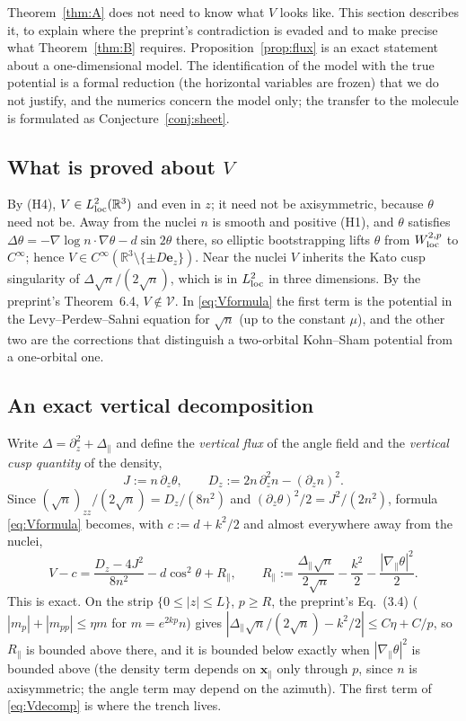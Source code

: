 \documentclass[11pt,a4paper]{article}
\theoremstyle{plain}
\theoremstyle{definition}
\theoremstyle{remark}
\newcommand{\R}{\mathbb{R}}
\newcommand{\VV}{\mathcal{V}}
\begin{document}
Theorem~\ref{thm:A} does not need to know what $V$ looks like. This section describes it, to explain where the preprint's contradiction is evaded and to make precise what Theorem~\ref{thm:B} requires. Proposition~\ref{prop:flux} is an exact statement about a one-dimensional model. The identification of the model with the true potential is a formal reduction (the horizontal variables are frozen) that we do not justify, and the numerics concern the model only; the transfer to the molecule is formulated as Conjecture~\ref{conj:sheet}.

\subsection{What is proved about $V$}
By (H4), $V\in L^2_{\rm loc}(\R^3)$ and even in $z$; it need not be axisymmetric, because $\theta$ need not be. Away from the nuclei $n$ is smooth and positive (H1), and $\theta$ satisfies $\Delta\theta=-\nabla\log n\cdot\nabla\theta-d\sin 2\theta$ there, so elliptic bootstrapping lifts $\theta$ from $W^{2,p}_{\rm loc}$ to $C^\infty$; hence $V\in C^\infty(\R^3\setminus\{\pm D\mathbf e_z\})$. Near the nuclei $V$ inherits the Kato cusp singularity of $\Delta\sqrt n/(2\sqrt n)$, which is in $L^2_{\rm loc}$ in three dimensions. By the preprint's Theorem~6.4, $V\notin\VV$. In \eqref{eq:Vformula} the first term is the potential in the Levy--Perdew--Sahni equation for $\sqrt n$ (up to the constant $\mu$), and the other two are the corrections that distinguish a two-orbital Kohn--Sham potential from a one-orbital one.

\subsection{An exact vertical decomposition}
Write $\Delta=\partial_z^2+\Delta_\parallel$ and define the \emph{vertical flux} of the angle field and the \emph{vertical cusp quantity} of the density,
\begin{equation}\label{eq:JD}
J:=n\,\partial_z\theta,\qquad D_z:=2n\,\partial_z^2n-(\partial_zn)^2 .
\end{equation}
Since $(\sqrt n)_{zz}/(2\sqrt n)=D_z/(8n^2)$ and $(\partial_z\theta)^2/2=J^2/(2n^2)$, formula \eqref{eq:Vformula} becomes, with $c:=d+k^2/2$ and almost everywhere away from the nuclei,
\begin{equation}\label{eq:Vdecomp}
V-c=\frac{D_z-4J^2}{8n^2}-d\cos^2\theta+R_\parallel,\qquad R_\parallel:=\frac{\Delta_\parallel\sqrt n}{2\sqrt n}-\frac{k^2}{2}-\frac{|\nabla_\parallel\theta|^2}{2}.
\end{equation}
This is exact. On the strip $\{0\le|z|\le L\}$, $p\ge R$, the preprint's Eq.~(3.4) ($|m_p|+|m_{pp}|\le\eta m$ for $m=e^{2kp}n$) gives $|\Delta_\parallel\sqrt n/(2\sqrt n)-k^2/2|\le C\eta+C/p$, so $R_\parallel$ is bounded above there, and it is bounded below exactly when $|\nabla_\parallel\theta|^2$ is bounded above (the density term depends on $\mathbf x_\parallel$ only through $p$, since $n$ is axisymmetric; the angle term may depend on the azimuth). The first term of \eqref{eq:Vdecomp} is where the trench lives.
\end{document}
